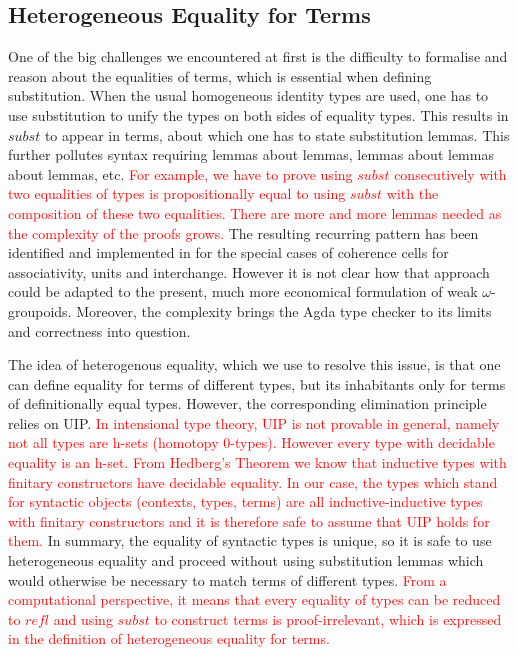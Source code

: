 \documentclass{acm_proc_article-sp}
\newcommand{\wog}{weak $\omega$-groupoids}
\newcommand{\new}{\textcolor{red}}
\begin{document}
\subsection{Heterogeneous Equality for Terms}

One of the big challenges we encountered at first is the difficulty to
formalise and reason about the equalities of terms, which is
essential when defining substitution.  When the usual homogeneous identity types
are used, one has to use substitution to unify
the types on both sides of equality types. This results in
$\mathit{subst}$ to appear in terms, about which one has to state
substitution lemmas. This further pollutes syntax requiring lemmas
about lemmas, lemmas about lemmas about lemmas, etc. \new{For example, we have to prove using $\mathit{subst}$ consecutively with two equalities of types is propositionally equal to using $\mathit{subst}$ with the composition of these two equalities. There are more and more lemmas needed as the complexity of the proofs grows.} The resulting
recurring pattern has been identified and implemented in
\cite{txa:csl} for the special cases of coherence cells for
associativity, units and interchange. However it is not clear how that
approach could be adapted to the present, much more economical
formulation of {\wog}. Moreover, the complexity brings the
Agda type checker to its limits and correctness into question.

The idea of heterogenous equality, which we use to resolve this issue,
is that one can define equality for terms of different types, but its
inhabitants only for terms of definitionally equal types. However, the
corresponding elimination principle relies on UIP. \new{In intensional type theory, UIP is not provable in general,
  namely not all types are h-sets (homotopy 0-types). However every type with decidable equality is an h-set.
  From Hedberg's Theorem \cite{hed:98} we know that inductive
  types with finitary constructors have decidable equality. In our
  case, the types which stand for syntactic objects (contexts, types, terms)
  are all inductive-inductive types with finitary constructors and it is
  therefore safe to assume that UIP holds for them. }
In summary, the equality of
syntactic types is unique, so it is safe to use heterogeneous equality
and proceed without using substitution lemmas which would otherwise be
necessary to match terms of different types. \new{From a computational perspective, it means that every equality of types can be reduced to $\mathit{refl}$ and using $\mathit{subst}$ to construct terms is proof-irrelevant, which is expressed in the definition of heterogeneous equality for terms. }
\end{document}

